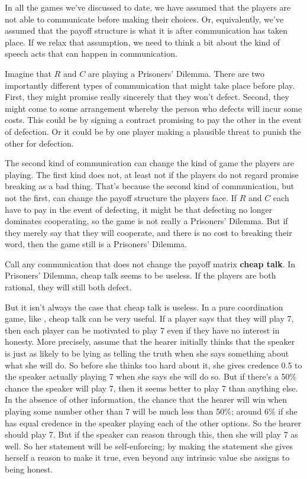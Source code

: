 In all the games we've discussed to date, we have assumed that the players are not able to communicate before making their choices. Or, equivalently, we've assumed that the payoff structure is what it is after communication has taken place. If we relax that assumption, we need to think a bit about the kind of speech acts that can happen in communication.

Imagine that $R$ and $C$ are playing a Prisoners' Dilemma. There are two importantly different types of communication that might take place before play. First, they might promise really sincerely that they won't defect. Second, they might come to some arrangement whereby the person who defects will incur some costs. This could be by signing a contract promising to pay the other in the event of defection. Or it could be by one player making a plausible threat to punish the other for defection.

The second kind of communication can change the kind of game the players are playing. The first kind does not, at least not if the players do not regard promise breaking as a bad thing. That's because the second kind of communication, but not the first, can change the payoff structure the players face. If $R$ and $C$ each have to pay in the event of defecting, it might be that defecting no longer dominates cooperating, so the game is not really a Prisoners' Dilemma. But if they merely say that they will cooperate, and there is no cost to breaking their word, then the game still is a Prisoners' Dilemma.

Call any communication that does not change the payoff matrix \textbf{cheap talk}. In Prisoners' Dilemma, cheap talk seems to be useless. If the players are both rational, they will still both defect. 

But it isn't always the case that cheap talk is useless. In a pure coordination game, like , cheap talk can be very useful. If a player says that they will play 7, then each player can be motivated to play 7 even if they have no interest in honesty. More precisely, assume that the hearer initially thinks that the speaker is just as likely to be lying as telling the truth when she says something about what she will do. So before she thinks too hard about it, she gives credence 0.5 to the speaker actually playing 7 when she says she will do so. But if there's a 50\% chance the speaker will play 7, then it seems better to play 7 than anything else. In the absence of other information, the chance that the hearer will win when playing some number other than 7 will be much less than 50\%; around 6\% if she has equal credence in the speaker playing each of the other options. So the hearer should play 7. But if the speaker can reason through this, then she will play 7 as well. So her statement will be self-enforcing; by making the statement she gives herself a reason to make it true, even beyond any intrinsic value she assigns to being honest.

